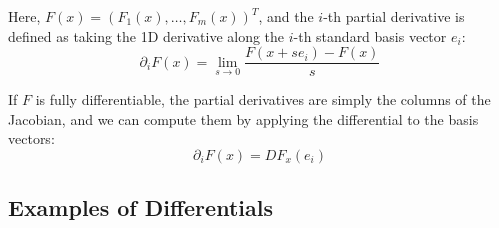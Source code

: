 Here, $F(x) = (F_1(x), \dots, F_m(x))^T$, and the $i$-th partial derivative is defined as taking the 1D derivative along the $i$-th standard basis vector $e_i$:
\[ \partial_i F(x) = \lim_{s \to 0} \frac{F(x + se_i) - F(x)}{s} \]

If $F$ is fully differentiable, the partial derivatives are simply the columns of the Jacobian, and we can compute them by applying the differential to the basis vectors:
\[ \partial_i F(x) = DF_x(e_i) \]


\subsection*{Examples of Differentials}

